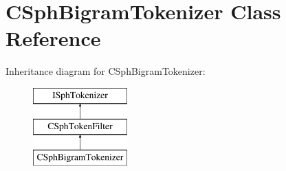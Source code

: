 \hypertarget{classCSphBigramTokenizer}{\section{C\-Sph\-Bigram\-Tokenizer Class Reference}
\label{classCSphBigramTokenizer}
}
Inheritance diagram for C\-Sph\-Bigram\-Tokenizer\-:\begin{figure}[H]
\begin{center}
\leavevmode
\includegraphics[height=3.000000cm]{classCSphBigramTokenizer}
\end{center}
\end{figure}
